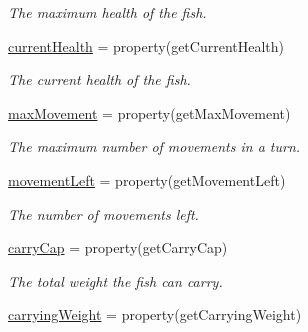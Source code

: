 \begin{DoxyCompactItemize}
\begin{DoxyCompactList}\small\item\em \-The maximum health of the fish. \end{DoxyCompactList}\item 
\hypertarget{classGameObject_1_1Fish_ad88dd955e813b5b0df04ec3b140dc83c}{\hyperlink{classGameObject_1_1Fish_ad88dd955e813b5b0df04ec3b140dc83c}{current\-Health} = property(get\-Current\-Health)}\label{classGameObject_1_1Fish_ad88dd955e813b5b0df04ec3b140dc83c}

\begin{DoxyCompactList}\small\item\em \-The current health of the fish. \end{DoxyCompactList}\item 
\hypertarget{classGameObject_1_1Fish_ac679a07976eb3d0ce34494285c187491}{\hyperlink{classGameObject_1_1Fish_ac679a07976eb3d0ce34494285c187491}{max\-Movement} = property(get\-Max\-Movement)}\label{classGameObject_1_1Fish_ac679a07976eb3d0ce34494285c187491}

\begin{DoxyCompactList}\small\item\em \-The maximum number of movements in a turn. \end{DoxyCompactList}\item 
\hypertarget{classGameObject_1_1Fish_a4dd06157ec213ba3a0b13d02147eeb0c}{\hyperlink{classGameObject_1_1Fish_a4dd06157ec213ba3a0b13d02147eeb0c}{movement\-Left} = property(get\-Movement\-Left)}\label{classGameObject_1_1Fish_a4dd06157ec213ba3a0b13d02147eeb0c}

\begin{DoxyCompactList}\small\item\em \-The number of movements left. \end{DoxyCompactList}\item 
\hypertarget{classGameObject_1_1Fish_a485dcfc214793f369685edf3db1a020d}{\hyperlink{classGameObject_1_1Fish_a485dcfc214793f369685edf3db1a020d}{carry\-Cap} = property(get\-Carry\-Cap)}\label{classGameObject_1_1Fish_a485dcfc214793f369685edf3db1a020d}

\begin{DoxyCompactList}\small\item\em \-The total weight the fish can carry. \end{DoxyCompactList}\item 
\hypertarget{classGameObject_1_1Fish_a573796615092d382cb7b572683f6ef51}{\hyperlink{classGameObject_1_1Fish_a573796615092d382cb7b572683f6ef51}{carrying\-Weight} = property(get\-Carrying\-Weight)}\label{classGameObject_1_1Fish_a573796615092d382cb7b572683f6ef51}


\end{DoxyCompactItemize}
